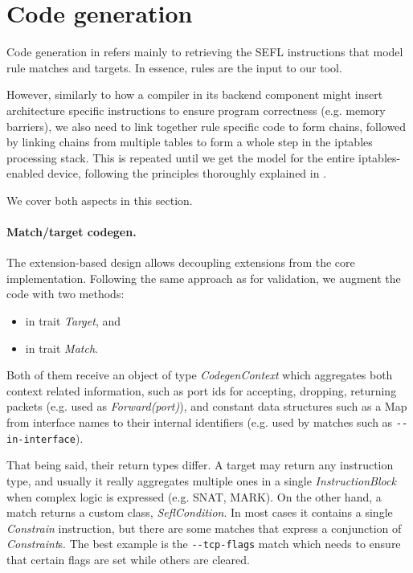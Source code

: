{\section{Code generation}\label{sec:codegen}

Code generation in \TOOL refers mainly to retrieving the SEFL instructions that
model rule matches and targets.  In essence, rules are the input to our tool.

However, similarly to how a compiler in its backend component might insert
architecture specific instructions to ensure program correctness (e.g. memory
barriers), we also need to link together rule specific code to form chains,
followed by linking chains from multiple tables to form a whole step in the
iptables processing stack.  This is repeated until we get the model for the
entire iptables-enabled device, following the principles thoroughly explained
in .

We cover both aspects in this section.

\paragraph{Match/target codegen.}  The extension-based design allows decoupling
extensions from the core implementation.  Following the same approach as for
validation, we augment the code with two methods:
\begin{itemize}
  \item {} in trait
    \emph{Target}, and
  \item {} in trait
    \emph{Match}.
\end{itemize}

Both of them receive an object of type \emph{CodegenContext} which aggregates
both context related information, such as port ids for accepting, dropping,
returning packets (e.g. used as \emph{Forward(port)}), and constant data
structures such as a Map from interface names to their internal identifiers
(e.g. used by matches such as \lstinline{--in-interface}).

That being said, their return types differ. A target may return any instruction
type, and usually it really aggregates multiple ones in a single
\emph{InstructionBlock} when complex logic is expressed (e.g. SNAT, MARK). On
the other hand, a match returns a custom class, \emph{SeflCondition}.  In most
cases it contains a single \emph{Constrain} instruction, but there are some
matches that express a conjunction of \emph{Constraint}s.  The best example is
the \lstinline{--tcp-flags} match which needs to ensure that certain flags are
set while others are cleared.

}

